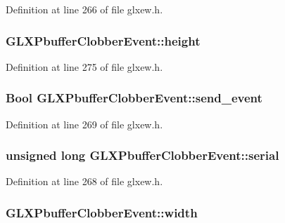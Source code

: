 Definition at line 266 of file glxew.\-h.

\hypertarget{struct_g_l_x_pbuffer_clobber_event_aed4e539c896bdad15217bf92c28f8520}{
\subsubsection[{height}]{ G\-L\-X\-Pbuffer\-Clobber\-Event\-::height}}\label{struct_g_l_x_pbuffer_clobber_event_aed4e539c896bdad15217bf92c28f8520}


Definition at line 275 of file glxew.\-h.

\hypertarget{struct_g_l_x_pbuffer_clobber_event_aa51969e67e4ad6095bda26ca64fe8ba6}{
\subsubsection[{send\-\_\-event}]{\setlength{\rightskip}{0pt plus 5cm}Bool G\-L\-X\-Pbuffer\-Clobber\-Event\-::send\-\_\-event}}\label{struct_g_l_x_pbuffer_clobber_event_aa51969e67e4ad6095bda26ca64fe8ba6}


Definition at line 269 of file glxew.\-h.

\hypertarget{struct_g_l_x_pbuffer_clobber_event_a6390b2875ae06a4cb827d2b4c321eda3}{
\subsubsection[{serial}]{\setlength{\rightskip}{0pt plus 5cm}unsigned long G\-L\-X\-Pbuffer\-Clobber\-Event\-::serial}}\label{struct_g_l_x_pbuffer_clobber_event_a6390b2875ae06a4cb827d2b4c321eda3}


Definition at line 268 of file glxew.\-h.

\hypertarget{struct_g_l_x_pbuffer_clobber_event_aaca375fecb872c73c60cd5d0bfc7c7a5}{
\subsubsection[{width}]{ G\-L\-X\-Pbuffer\-Clobber\-Event\-::width}}\label{struct_g_l_x_pbuffer_clobber_event_aaca375fecb872c73c60cd5d0bfc7c7a5}


